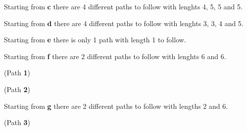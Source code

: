 \documentclass[11pt, a4paper]{article}
\begin{document}
{{\vspace{1mm}\noindent [ b e ]

\vspace{2mm}\noindent
Starting from \textbf{c} there are 4 different paths to follow with lenghts 4, 5, 5 and 5.

\vspace{1mm}\noindent [ c a d f ]

\vspace{1mm}\noindent [ c a d b e ]

\vspace{1mm}\noindent [ c a d g e ]

\vspace{1mm}\noindent [ c a d g f ]

\vspace{2mm}\noindent
Starting from \textbf{d} there are 4 different paths to follow with lenghts 3, 3, 4 and 5.

\vspace{1mm}\noindent [ d b e ]

\vspace{1mm}\noindent [ d g e ]

\vspace{1mm}\noindent [ d f c a ]

\vspace{1mm}\noindent [ d g f c a ]

\vspace{2mm}\noindent
Starting from \textbf{e} there is only 1 path with length 1 to follow.

\vspace{1mm}\noindent [ e ]

\vspace{2mm}\noindent
Starting from \textbf{f} there are 2 different paths to follow with lenghts 6 and 6.

\vspace{1mm}\noindent [ f c a d b e ] (Path \textbf{1})

\vspace{1mm}\noindent [ f c a d g e ] (Path \textbf{2})

\vspace{2mm}\noindent
Starting from \textbf{g} there are 2 different paths to follow with lengths 2 and 6.

\vspace{1mm}\noindent [ g e ]

\vspace{1mm}\noindent [ g f c a d b ] (Path \textbf{3})

}}
\end{document}
